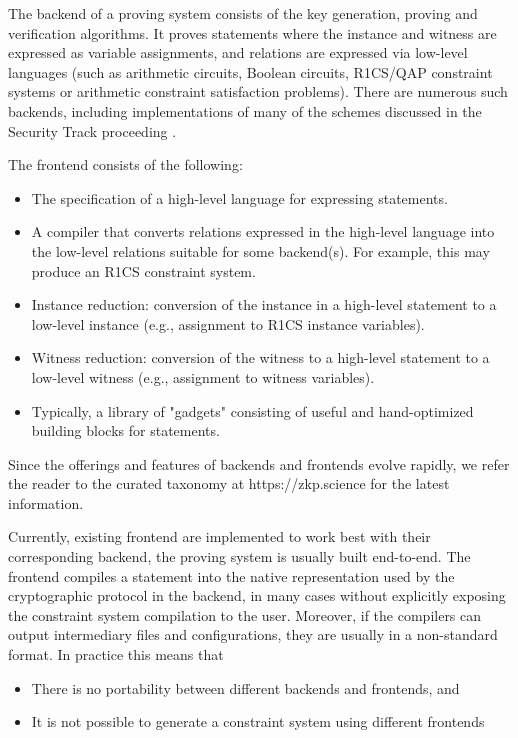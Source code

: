 \documentclass[a4paper,11pt]{article}
\newcommand{\dnote}[1]{\dtcolornote[Daniel]{red}{#1}}
\begin{document}
The backend of a proving system consists of the key generation, proving and verification algorithms. It proves statements where the instance and witness are expressed as variable assignments, and relations are expressed via low-level languages (such as arithmetic circuits, Boolean circuits, R1CS/QAP constraint systems or arithmetic constraint satisfaction problems). There are numerous such backends, including implementations of many of the schemes discussed in the Security Track proceeding \dnote{cite: security track proceeding}.

The frontend consists of the following:
\begin{itemize}
	\item The specification of a high-level language for expressing statements.
	\item A compiler that converts relations expressed in the high-level language into the low-level relations suitable for some backend(s). For example, this may produce an R1CS constraint system.
	\item Instance reduction: conversion of the instance in a high-level statement to a low-level instance (e.g., assignment to R1CS instance variables).
	\item Witness reduction: conversion of the witness to a high-level statement to a low-level witness (e.g., assignment to witness variables).
	\item Typically, a library of "gadgets" consisting of useful and hand-optimized building blocks for statements.
\end{itemize}

Since the offerings and features of backends and frontends evolve rapidly, we refer the reader to the curated taxonomy at https://zkp.science for the latest information. 

Currently, existing frontend are implemented to work best with their corresponding backend, the proving system is usually built end-to-end. The frontend compiles a statement into the native representation used by the cryptographic protocol in the backend, in many cases without explicitly exposing the constraint system compilation to the user. Moreover, if the compilers can output intermediary files and configurations, they are usually in a non-standard format. In practice this means that
\begin{itemize}
	\item There is no portability between different backends and frontends, and
	\item It is not possible to generate a constraint system using different frontends
\end{itemize}   
\end{document}
